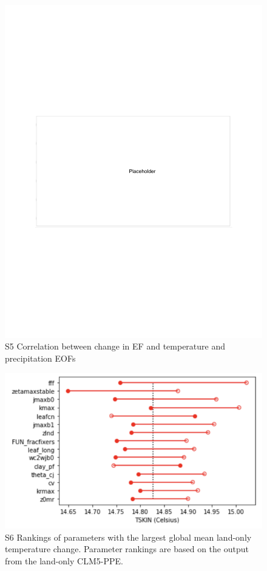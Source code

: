 \documentclass[draft,grl]{agutexSI2019}
\begin{document}
\begin{figure}[htb!]
\noindent\includegraphics[width=\textwidth]{writing/figs/placeholder.pdf}
\caption{S5 Correlation between change in EF and temperature and precipitation EOFs}
\label{fig:supp_EF_EOF_correlation}
\end{figure}


\begin{figure}[htb!]
\noindent\includegraphics[width=\textwidth]{writing/figs/FigureS6.png}
\caption{S6 Rankings of parameters with the largest global mean land-only temperature change. Parameter rankings are based on the output from the land-only CLM5-PPE.}
\label{fig:supp_param_rankings}
\end{figure}
\end{document}
